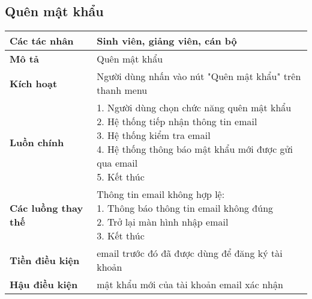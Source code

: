 \subsection*{Quên mật khẩu}
	\begin{tabular}{|l|p{}|}
		\hline
		\textbf{Các tác nhân}         & Sinh viên, giảng viên, cán bộ                            \\
		\hline
		\textbf{Mô tả}                & Quên mật khẩu                                           \\
		\hline
		\textbf{Kích hoạt}            & Người dùng nhấn vào nút "Quên mật khẩu" trên thanh menu \\
		\hline
		\textbf{Luồn chính}           & \makecell[l]{1. Người dùng chọn chức năng quên mật khẩu \\ 2. Hệ thống tiếp nhận thông tin email \\ 3. Hệ thống kiểm tra email \\ 4. Hệ thống thông báo mật khẩu mới được gửi qua email \\ 5. Kết thúc} \\
		\hline
		\textbf{Các luồng thay thế}   & \makecell[l]{Thông tin email không hợp lệ:              \\ 1. Thông báo thông tin email không đúng \\ 2. Trở lại màn hình nhập email \\ 3. Kết thúc} \\
		\hline
		\textbf{Tiền điều kiện}       & email trước đó đã được dùng để đăng ký tài khoản        \\
		\hline
		\textbf{Hậu điều kiện}        & mật khẩu mới của tài khoản email xác nhận               \\
		\hline
	\end{tabular}

